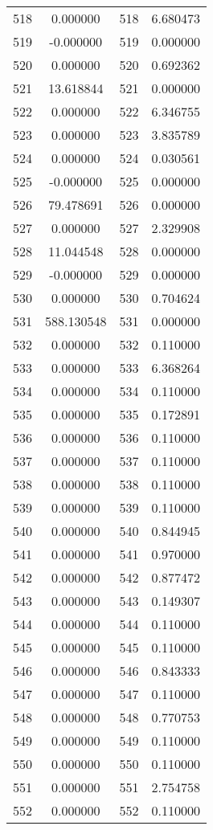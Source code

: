 \documentclass[12pt]{article}
\begin{document}
\begin{longtable}{@{}cccc@{}}
518 & 0.000000 & 518 & 6.680473 \\
519 & -0.000000 & 519 & 0.000000 \\
520 & 0.000000 & 520 & 0.692362 \\
521 & 13.618844 & 521 & 0.000000 \\
522 & 0.000000 & 522 & 6.346755 \\
523 & 0.000000 & 523 & 3.835789 \\
524 & 0.000000 & 524 & 0.030561 \\
525 & -0.000000 & 525 & 0.000000 \\
526 & 79.478691 & 526 & 0.000000 \\
527 & 0.000000 & 527 & 2.329908 \\
528 & 11.044548 & 528 & 0.000000 \\
529 & -0.000000 & 529 & 0.000000 \\
530 & 0.000000 & 530 & 0.704624 \\
531 & 588.130548 & 531 & 0.000000 \\
532 & 0.000000 & 532 & 0.110000 \\
533 & 0.000000 & 533 & 6.368264 \\
534 & 0.000000 & 534 & 0.110000 \\
535 & 0.000000 & 535 & 0.172891 \\
536 & 0.000000 & 536 & 0.110000 \\
537 & 0.000000 & 537 & 0.110000 \\
538 & 0.000000 & 538 & 0.110000 \\
539 & 0.000000 & 539 & 0.110000 \\
540 & 0.000000 & 540 & 0.844945 \\
541 & 0.000000 & 541 & 0.970000 \\
542 & 0.000000 & 542 & 0.877472 \\
543 & 0.000000 & 543 & 0.149307 \\
544 & 0.000000 & 544 & 0.110000 \\
545 & 0.000000 & 545 & 0.110000 \\
546 & 0.000000 & 546 & 0.843333 \\
547 & 0.000000 & 547 & 0.110000 \\
548 & 0.000000 & 548 & 0.770753 \\
549 & 0.000000 & 549 & 0.110000 \\
550 & 0.000000 & 550 & 0.110000 \\
551 & 0.000000 & 551 & 2.754758 \\
552 & 0.000000 & 552 & 0.110000 \\

\end{longtable}
\end{document}
